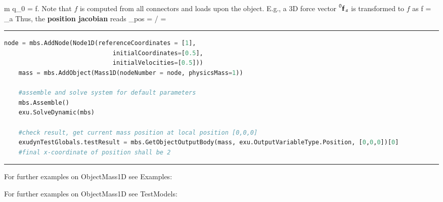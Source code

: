     \be 
      m \cdot \ddot q_0 = f.
    \ee
    Note that $f$ is computed from all connectors and loads upon the object. E.g., a 3D force vector $\prescript{0}{}{\mathbf{f}}\,_a$ is 
    transformed to $f$ as
    \be
      f =   _a
    \ee
    Thus, the {\bf position jacobian} reads 
    \be
      \Jm_{pos} = \partial \pv\cCur / \cCur = 
        
    \ee
\vspace{6pt}\par\noindent\rule{\textwidth}{0.4pt}
\label{miniExample_ObjectMass1D}
\pythonstyle
\begin{lstlisting}[language=Python, firstnumber=1]
    node = mbs.AddNode(Node1D(referenceCoordinates = [1], 
                              initialCoordinates=[0.5],
                              initialVelocities=[0.5]))
    mass = mbs.AddObject(Mass1D(nodeNumber = node, physicsMass=1))

    #assemble and solve system for default parameters
    mbs.Assemble()
    exu.SolveDynamic(mbs)

    #check result, get current mass position at local position [0,0,0]
    exudynTestGlobals.testResult = mbs.GetObjectOutputBody(mass, exu.OutputVariableType.Position, [0,0,0])[0]
    #final x-coordinate of position shall be 2

\end{lstlisting}

\vspace{6pt}\par\noindent\rule{\textwidth}{0.4pt}
%
\noindent For further examples on ObjectMass1D see Examples:
\bi
\item{}\item{}\ei

%
%
\noindent For further examples on ObjectMass1D see TestModels:
\bi
\item{}\ei

%
\newpage

